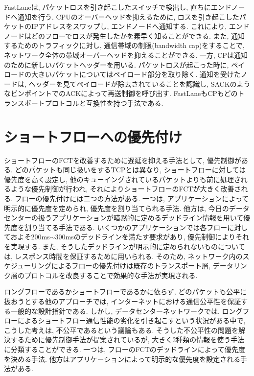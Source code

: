FastLane\cite{fastlane}は, パケットロスを引き起こしたスイッチで検出し, 直ちにエンドノードへ通知を行う. 
CPUのオーバーヘッドを抑えるために, ロスを引き起こしたパケットのIPアドレスをスワップし, エンドノードへ通知する. 
これにより, エンドノードはどのフローでロスが発生したかを素早く知ることができる. 
また, 通知するためのトラフィックに対し, 通信帯域の制限(bandwidth cap)をすることで,
ネットワーク全体の帯域オーバーヘッドを抑えることができる. 
一方, CP\cite{cp}は通知のために新しいパケットヘッダーを用いる. 
パケットロスが起こった時に, ペイロードの大きいパケットについてはペイロード部分を取り除く. 
通知を受けたノードは, ヘッダーを見てペイロードが除去されていることを認識し, 
SACKのようなピンポイントでのACKによって再送制御を呼び出す. 
FastLaneもCPもどのトランスポートプロトコルと互換性を持つ手法である. 

\section{ショートフローへの優先付け}
ショートフローのFCTを改善するために遅延を抑える手法として, 優先制御がある. 
どのパケットも同じ扱いをするTCPとは異なり, ショートフローに対しては優先度を高く設定し,
他のキューイングされているパケットよりも前に処理されるような優先制御が行われ, それによりショートフローのFCTが大きく改善される. 
フローの優先付けには二つの方法がある. 
一つは, アプリケーションによって明示的に優先度を定められ, 優先度を割り当てられる手法\cite{pfabric, detail}. 
他方は, 今日のデータセンターの扱うアプリケーションが暗黙的に定めるデッドライン情報を用いて優先度を割り当てる手法である. 
いくつかのアプリケーションでは各フローに対しておよそ200ms$\sim$300msのデッドラインを満たす要求があり, 優先制御によりそれを実現する. 
また, そうしたデッドラインが明示的に定められないものについては, レスポンス時間を保証するために用いられる\cite{mcp, pdq, d2tcp, d3}.
そのため, ネットワーク内のスケジューリングによるフローの優先付けは既存のトランスポート層,
データリンク層のプロトコルを改良することで効果的な手法が実現される. 

ロングフローであるかショートフローであるかに依らず, どのパケットも公平に扱おうとする他のアプローチでは,
インターネットにおける通信公平性を保証する一般的な設計指針である. 
しかし, データセンターネットワークでは, ロングフローによるショートフロー通信性能の劣化を引き起こすという状況がある中で, こうした考えは,
不公平であるという議論もある\cite{mcp, pdq, d2tcp, d3}.
そうした不公平性の問題を解決するために優先制御手法が提案されているが, 大きく2種類の情報を使う手法に分類することができる. 
一つは, フローのFCTのデッドラインによって優先度を決める手法. 
他方はアプリケーションによって明示的な優先度を設定される手法がある. 

